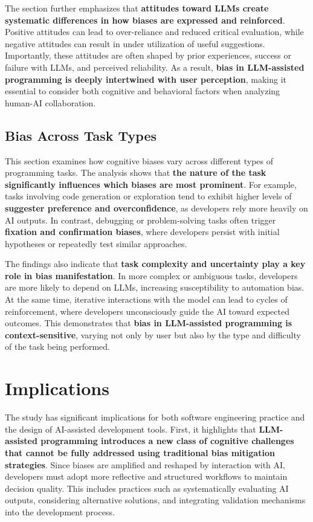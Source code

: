 The section further emphasizes that \textbf{attitudes toward LLMs create systematic differences in how biases are expressed and reinforced}. Positive attitudes can lead to over-reliance and reduced critical evaluation, while negative attitudes can result in under utilization of useful suggestions. Importantly, these attitudes are often shaped by prior experiences, success or failure with LLMs, and perceived reliability. As a result, \textbf{bias in LLM-assisted programming is deeply intertwined with user perception}, making it essential to consider both cognitive and behavioral factors when analyzing human-AI collaboration.

\subsection{Bias Across Task Types}
This section examines how cognitive biases vary across different types of programming tasks. The analysis shows that \textbf{the nature of the task significantly influences which biases are most prominent}. For example, tasks involving code generation or exploration tend to exhibit higher levels of \textbf{suggester preference and overconfidence}, as developers rely more heavily on AI outputs. In contrast, debugging or problem-solving tasks often trigger \textbf{fixation and confirmation biases}, where developers persist with initial hypotheses or repeatedly test similar approaches.

The findings also indicate that \textbf{task complexity and uncertainty play a key role in bias manifestation}. In more complex or ambiguous tasks, developers are more likely to depend on LLMs, increasing susceptibility to automation bias. At the same time, iterative interactions with the model can lead to cycles of reinforcement, where developers unconsciously guide the AI toward expected outcomes. This demonstrates that \textbf{bias in LLM-assisted programming is context-sensitive}, varying not only by user but also by the type and difficulty of the task being performed.

\section{Implications}
The study has significant implications for both software engineering practice and the design of AI-assisted development tools. First, it highlights that \textbf{LLM-assisted programming introduces a new class of cognitive challenges that cannot be fully addressed using traditional bias mitigation strategies}. Since biases are amplified and reshaped by interaction with AI, developers must adopt more reflective and structured workflows to maintain decision quality. This includes practices such as systematically evaluating AI outputs, considering alternative solutions, and integrating validation mechanisms into the development process.

